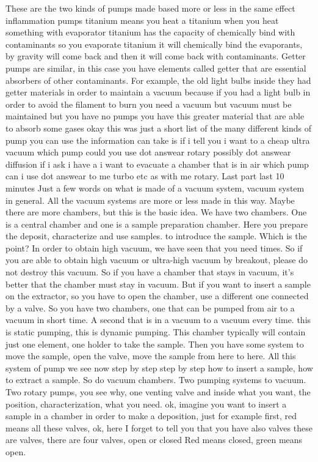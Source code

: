 These are the two kinds of pumps made based more or less in the same effect inflammation pumps titanium means you heat a titanium when you heat something with evaporator titanium has the capacity of chemically bind with contaminants so you evaporate titanium it will chemically bind the evaporants, by gravity will come back and then it will come back with contaminants. Getter pumps are similar, in this case you have elements called getter that are essential absorbers of other contaminants. For example, the old light bulbs inside they had getter materials in order to maintain a vacuum because if you had a light bulb in order to avoid the filament to burn you need a vacuum but vacuum must be maintained but you have no pumps you have this greater material that are able to absorb some gases okay this was just a short list of the many different kinds of pump you can use the information can take is if i tell you i want to a cheap ultra vacuum which pump could you use dot answear rotary possibly dot answear diffusion if i ask i have a i want to evacuate a chamber that is in air which pump can i use dot answear to me turbo etc as with me rotary.
Last part last 10 minutes Just a few words on what is made of a vacuum system, vacuum system in general. All the vacuum systems are more or less made in this way. Maybe there are more chambers, but this is the basic idea. We have two chambers. One is a central chamber and one is a sample preparation chamber. Here you prepare the deposit, characterize and use samples. to introduce the sample. Which is the point? In order to obtain high vacuum, we have seen that you need times. So if you are able to obtain high vacuum or ultra-high vacuum by breakout, please do not destroy this vacuum. So if you have a chamber that stays in vacuum, it's better that the chamber must stay in vacuum. But if you want to insert a sample on the extractor, so you have to open the chamber, use a different one connected by a valve. So you have two chambers, one that can be pumped from air to a vacuum in short time. A second that is in a vacuum to a vacuum every time. this is static pumping, this is dynamic pumping. This chamber typically will contain just one element, one holder to take the sample. Then you have some system to move the sample, open the valve, move the sample from here to here. All this system of pump we see now step by step step by step how to insert a sample, how to extract a sample. So do vacuum chambers. Two pumping systems to vacuum. Two rotary pumps, you see why, one venting valve and inside what you want, the position, characterization, what you need. ok, imagine you want to insert a sample in a chamber in order to make a deposition, just for example first, red means all these valves, ok, here I forget to tell you that you have also valves these are valves, there are four valves, open or closed Red means closed, green means open.
